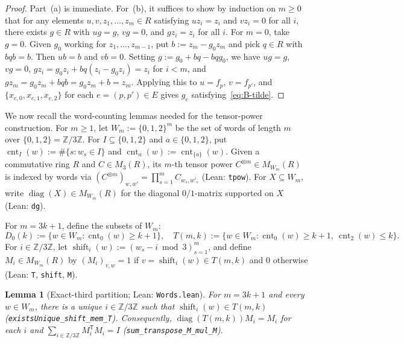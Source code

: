 \documentclass[11pt]{article}
\newtheorem{lemma}[theorem]{Lemma}
\theoremstyle{definition}
\theoremstyle{remark}
\numberwithin{equation}{section}
\DeclareMathOperator{\diag}{diag}
\DeclareMathOperator{\cnt}{cnt}
\newcommand{\Z}{\mathbb{Z}}
\newcommand{\1}{\mathbf{1}}
\newcommand{\code}[1]{{\normalfont\small\texttt{#1}}}
\begin{document}
\begin{proof}
Part~(a) is immediate. For~(b), it suffices to show by induction on $m \ge 0$ that for any elements $u, v, z_1, \dots, z_m \in R$ satisfying $u z_i = z_i$ and $v z_i = 0$ for all $i$, there exists $g \in R$ with $ug = g$, $vg = 0$, and $g z_i = z_i$ for all $i$. For $m = 0$, take $g = 0$. Given $g_0$ working for $z_1, \dots, z_{m-1}$, put $b := z_m - g_0 z_m$ and pick $q \in R$ with $bqb = b$. Then $ub = b$ and $vb = 0$. Setting $g := g_0 + bq - bq g_0$, we have $ug = g$, $vg = 0$, $g z_i = g_0 z_i + bq(z_i - g_0 z_i) = z_i$ for $i < m$, and $g z_m = g_0 z_m + bq b = g_0 z_m + b = z_m$. Applying this to $u = f_p$, $v = f_{p'}$, and $\{x_{e,0}, x_{e,1}, x_{e,2}\}$ for each $e = (p, p') \in E$ gives $g_e$ satisfying~\eqref{eq:B-tilde}.
\end{proof}

We now recall the word-counting lemmas needed for the tensor-power construction. For $m \ge 1$, let $W_m := \{0, 1, 2\}^m$ be the set of words of length $m$ over $\{0, 1, 2\} = \Z/3\Z$. For $I \subseteq \{0,1,2\}$ and $a \in \{0,1,2\}$, put $\cnt_I(w) := \#\{s : w_s \in I\}$ and $\cnt_a(w) := \cnt_{\{a\}}(w)$. Given a commutative ring $R$ and $C \in M_3(R)$, its $m$-th tensor power $C^{\otimes m} \in M_{W_m}(R)$ is indexed by words via $(C^{\otimes m})_{w, w'} = \prod_{s=1}^m C_{w_s, w'_s}$ (Lean: \code{tpow}). For $X \subseteq W_m$, write $\diag(X) \in M_{W_m}(R)$ for the diagonal $0/1$-matrix supported on $X$ (Lean: \code{dg}).

For $m = 3k + 1$, define the subsets of $W_m$:
\[
D_0(k) := \{w \in W_m : \cnt_0(w) \ge k + 1\}, \quad
T(m, k) := \{w \in W_m : \cnt_0(w) \ge k + 1,\ \cnt_2(w) \le k\}.
\]
For $i \in \Z/3\Z$, let $\operatorname{shift}_i(w) := (w_s - i \bmod 3)_{s=1}^m$, and define $M_i \in M_{W_m}(R)$ by $(M_i)_{v, w} = 1$ if $v = \operatorname{shift}_i(w) \in T(m, k)$ and $0$ otherwise (Lean: \code{T}, \code{shift}, \code{M}).

\begin{lemma}[Exact-third partition; Lean: \code{Words.lean}]
\label{lem:exact-third}
For $m = 3k + 1$ and every $w \in W_m$, there is a unique $i \in \Z/3\Z$ such that $\operatorname{shift}_i(w) \in T(m, k)$ (\code{existsUnique\_shift\_mem\_T}). Consequently, $\diag(T(m, k)) M_i = M_i$ for each $i$ and $\sum_{i \in \Z/3\Z} M_i^\mathsf{T} M_i = I$ (\code{sum\_transpose\_M\_mul\_M}).
\end{lemma}
\end{document}
